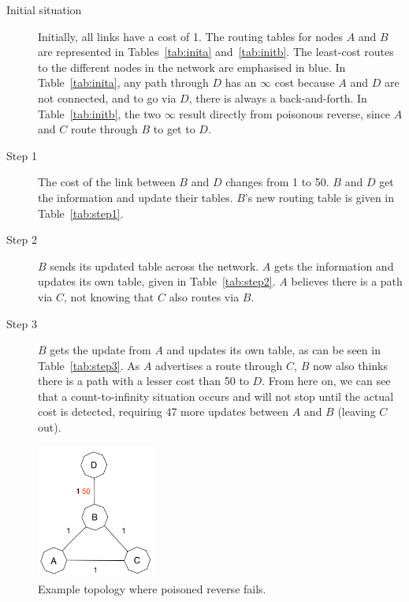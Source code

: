 \documentclass[12pt,a4paper]{article}
\begin{document}
\begin{description}
\item[Initial situation] Initially, all links have a cost of 1. The routing tables for nodes $A$ and $B$ are represented in Tables~\ref{tab:inita} and~\ref{tab:initb}. The least-cost routes to the different nodes in the network are emphasised in blue. In Table~\ref{tab:inita}, any path through $D$ has an $\infty$ cost because $A$ and $D$ are not connected, and to go via $D$, there is always a back-and-forth. In Table~\ref{tab:initb}, the two $\infty$ result directly from poisonous reverse, since $A$ and $C$ route through $B$ to get to $D$.

\item[Step 1] The cost of the link between $B$ and $D$ changes from 1 to 50. $B$ and $D$ get the information and update their tables. $B$'s new routing table is given in Table~\ref{tab:step1}.

\item[Step 2] $B$ sends its updated table across the network. $A$ gets the information and updates its own table, given in Table~\ref{tab:step2}. $A$ believes there is a path via $C$, not knowing that $C$ also routes via $B$.

\item[Step 3] $B$ gets the update from $A$ and updates its own table, as can be seen in Table~\ref{tab:step3}. As $A$ advertises a route through $C$, $B$ now also thinks there is a path with a lesser cost than 50 to $D$. From here on, we can see that a count-to-infinity situation occurs and will not stop until the actual cost is detected, requiring 47 more updates between $A$ and $B$ (leaving $C$ out).
\end{description}

\begin{figure}[!ht]
\centering
\includegraphics[width=0.35\textwidth]{Fail.png}
\caption{Example topology where poisoned reverse fails.}
\label{fig:fail}
\end{figure}
\end{document}
